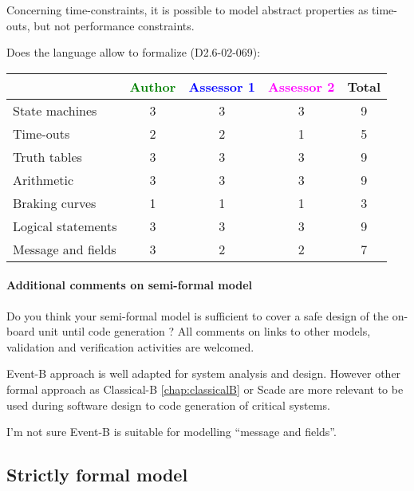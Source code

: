 \begin{author_comment}
Concerning time-constraints, it is possible to  model  abstract properties as time-outs, but not performance constraints.
\end{author_comment}


Does the language allow to  formalize (D2.6-02-069):

\begin{tabular}{|l | c | c | c | c|}
\hline
& \textcolor{green}{Author} & \textcolor{blue}{Assessor 1} & \textcolor{magenta}{Assessor 2} & Total \\
\hline 
State machines  & 3 & 3 & 3 & 9 \\
\hline
Time-outs  & 2 & 2 & 1 & 5 \\
\hline
Truth tables  & 3 & 3 & 3 & 9 \\
\hline
Arithmetic  & 3 & 3 & 3 & 9 \\
\hline
Braking curves  & 1 & 1 & 1 & 3 \\
\hline
Logical statements & 3 & 3 & 3 & 9 \\
\hline
Message and fields & 3 & 2 & 2 & 7 \\
\hline
\end{tabular}

\paragraph{Additional comments on semi-formal  model} Do you think your semi-formal  model is sufficient to cover a safe design of the on-board unit until code generation ?
All comments on links to  other models, validation and verification activities are welcomed.


\begin{author_comment}
Event-B  approach is well adapted for system analysis and design. However other formal approach as Classical-B \ref{chap:classicalB} or Scade are more relevant to be used during software design to code generation of critical systems.
\end{author_comment}


\begin{assessor1}
I'm not sure Event-B is suitable for modelling ``message and fields''.
\end{assessor1}


\subsection{Strictly formal model}


